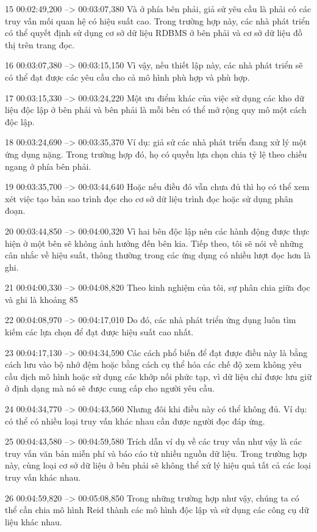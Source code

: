 15
00:02:49,200 --> 00:03:07,380
Và ở phía bên phải, giả sử yêu cầu là phải có các truy vấn mối quan hệ có hiệu suất cao.  Trong trường hợp này, các nhà phát triển có thể quyết định sử dụng cơ sở dữ liệu RDBMS ở bên phải và cơ sở dữ liệu đồ thị trên trang đọc.

16
00:03:07,380 --> 00:03:15,150
Vì vậy, nếu thiết lập này, các nhà phát triển sẽ có thể đạt được các yêu cầu cho cả mô hình phù hợp và phù hợp.

17
00:03:15,330 --> 00:03:24,220
Một ưu điểm khác của việc sử dụng các kho dữ liệu độc lập ở bên phải và bên phải là mỗi bên có thể mở rộng quy mô một cách độc lập.

18
00:03:24,690 --> 00:03:35,370
Ví dụ: giả sử các nhà phát triển đang xử lý một ứng dụng nặng.  Trong trường hợp đó, họ có quyền lựa chọn chia tỷ lệ theo chiều ngang ở phía bên phải.

19
00:03:35,700 --> 00:03:44,640
Hoặc nếu điều đó vẫn chưa đủ thì họ có thể xem xét việc tạo bản sao trình đọc cho cơ sở dữ liệu trình đọc hoặc sử dụng phân đoạn.

20
00:03:44,850 --> 00:04:00,320
Vì hai bên độc lập nên các hành động được thực hiện ở một bên sẽ không ảnh hưởng đến bên kia.  Tiếp theo, tôi sẽ nói về những cân nhắc về hiệu suất, thông thường trong các ứng dụng có nhiều lượt đọc hơn là ghi.

21
00:04:00,330 --> 00:04:08,820
Theo kinh nghiệm của tôi, sự phân chia giữa đọc và ghi là khoảng 85%

22
00:04:08,970 --> 00:04:17,010
Do đó, các nhà phát triển ứng dụng luôn tìm kiếm các lựa chọn để đạt được hiệu suất cao nhất.

23
00:04:17,130 --> 00:04:34,590
Các cách phổ biến để đạt được điều này là bằng cách lưu vào bộ nhớ đệm hoặc bằng cách cụ thể hóa các chế độ xem không yêu cầu dịch mô hình hoặc sử dụng các khớp nối phức tạp, vì dữ liệu chỉ được lưu giữ ở định dạng mà nó sẽ được cung cấp cho người yêu cầu.

24
00:04:34,770 --> 00:04:43,560
Nhưng đôi khi điều này có thể không đủ.  Ví dụ: có thể có nhiều loại truy vấn khác nhau cần được người đọc đáp ứng.

25
00:04:43,580 --> 00:04:59,580
Trích dẫn ví dụ về các truy vấn như vậy là các truy vấn văn bản miễn phí và báo cáo từ nhiều nguồn dữ liệu.  Trong trường hợp này, cùng loại cơ sở dữ liệu ở bên phải sẽ không thể xử lý hiệu quả tất cả các loại truy vấn khác nhau.

26
00:04:59,820 --> 00:05:08,850
Trong những trường hợp như vậy, chúng ta có thể cần chia mô hình Reid thành các mô hình độc lập và sử dụng các công cụ dữ liệu khác nhau.

